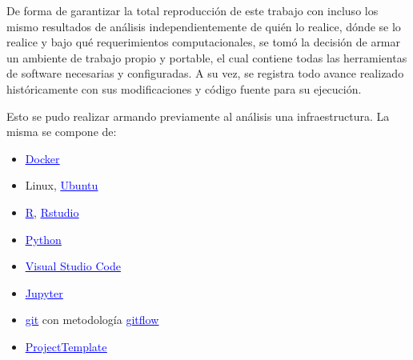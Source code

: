 De forma de garantizar la total reproducción de este trabajo con incluso los mismo resultados de análisis independientemente de quién lo realice, dónde se lo realice y bajo qué requerimientos computacionales, se tomó la decisión de armar un ambiente de trabajo propio y portable, el cual contiene todas las herramientas de software necesarias y configuradas. A su vez, se registra todo avance realizado históricamente con sus modificaciones y código fuente para su ejecución.

Esto se pudo realizar armando previamente al análisis una infraestructura. La misma se compone de:

\begin{itemize}
\item \href{https://www.docker.com/}{\textcolor{blue}{\underline{Docker}}}
\item Linux, \href{https://ubuntu.com/}{\textcolor{blue}{\underline{Ubuntu}}}
\item \href{ https://www.r-project.org/}{\textcolor{blue}{\underline{R}}}, \href{https://rstudio.com/}{\textcolor{blue}{\underline{Rstudio}}}
\item \href{https://www.python.org/}{\textcolor{blue}{\underline{Python}}}
\item \href{https://code.visualstudio.com/}{\textcolor{blue}{\underline{Visual Studio Code}}}
\item \href{https://jupyter.org/}{\textcolor{blue}{\underline{Jupyter}}} 
\item \href{https://git-scm.com/}{\textcolor{blue}{\underline{git}}} con metodología \href{https://github.com/nvie/gitflow}{\textcolor{blue}{\underline{gitflow}}}
\item \href{http://projecttemplate.net/index.html}{\textcolor{blue}{\underline{ProjectTemplate}}} 
\end{itemize}

